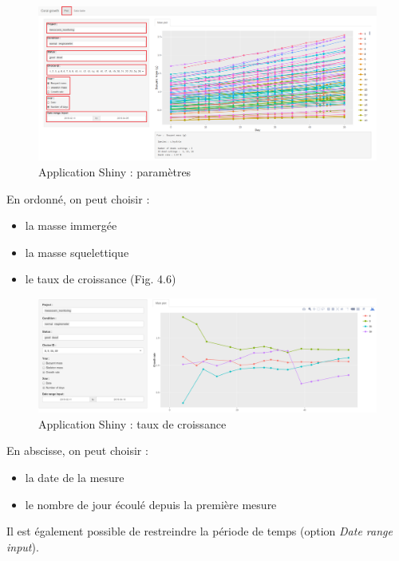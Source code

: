 \documentclass[]{report}
\providecommand{\tightlist}{%
  \setlength{\itemsep}{0pt}\setlength{\parskip}{0pt}}
\begin{document}
\begin{figure}
\centering
\includegraphics[width=15.00000cm]{../image/notebook-plot2.PNG}
\caption{Application Shiny : paramètres}
\end{figure}

\vspace{0.5cm}

\null
\newpage

En ordonné, on peut choisir :

\begin{itemize}
\tightlist
\item
  la masse immergée
\item
  la masse squelettique
\item
  le taux de croissance (Fig. 4.6) 
\end{itemize}

\begin{figure}[h!]
\includegraphics[]{../image/taux-croissance.PNG}
\caption{Application Shiny : taux de croissance}
\end{figure}

En abscisse, on peut choisir :

\begin{itemize}
\tightlist
\item
  la date de la mesure
\item
  le nombre de jour écoulé depuis la première mesure
\end{itemize}

Il est également possible de restreindre la période de temps (option
\emph{Date range input}).
\end{document}
